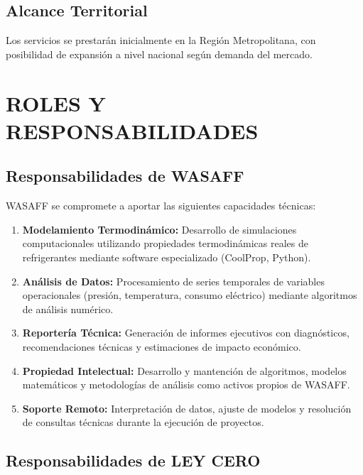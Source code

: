 \documentclass[11pt,letterpaper]{article}
\begin{document}
\subsection{Alcance Territorial}

Los servicios se prestarán inicialmente en la Región Metropolitana, con posibilidad de expansión a nivel nacional según demanda del mercado.


\section{ROLES Y RESPONSABILIDADES}

\subsection{Responsabilidades de WASAFF}

WASAFF se compromete a aportar las siguientes capacidades técnicas:

\begin{enumerate}[label=\arabic*.]
    \item \textbf{Modelamiento Termodinámico:} Desarrollo de simulaciones computacionales utilizando propiedades termodinámicas reales de refrigerantes mediante software especializado (CoolProp, Python).
    
    \item \textbf{Análisis de Datos:} Procesamiento de series temporales de variables operacionales (presión, temperatura, consumo eléctrico) mediante algoritmos de análisis numérico.
    
    \item \textbf{Reportería Técnica:} Generación de informes ejecutivos con diagnósticos, recomendaciones técnicas y estimaciones de impacto económico.
    
    \item \textbf{Propiedad Intelectual:} Desarrollo y mantención de algoritmos, modelos matemáticos y metodologías de análisis como activos propios de WASAFF.
    
    \item \textbf{Soporte Remoto:} Interpretación de datos, ajuste de modelos y resolución de consultas técnicas durante la ejecución de proyectos.
\end{enumerate}

\subsection{Responsabilidades de LEY CERO}
\end{document}
